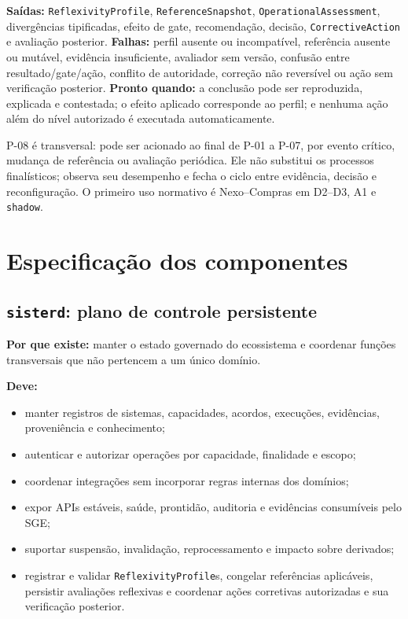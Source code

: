 \documentclass[11pt,a4paper,oneside]{article}
\begin{document}
\textbf{Saídas:} \texttt{ReflexivityProfile}, \texttt{ReferenceSnapshot}, \texttt{OperationalAssessment}, divergências tipificadas, efeito de gate, recomendação, decisão, \texttt{CorrectiveAction} e avaliação posterior.  
\textbf{Falhas:} perfil ausente ou incompatível, referência ausente ou mutável, evidência insuficiente, avaliador sem versão, confusão entre resultado/gate/ação, conflito de autoridade, correção não reversível ou ação sem verificação posterior.  
\textbf{Pronto quando:} a conclusão pode ser reproduzida, explicada e contestada; o efeito aplicado corresponde ao perfil; e nenhuma ação além do nível autorizado é executada automaticamente.

P-08 é transversal: pode ser acionado ao final de P-01 a P-07, por evento crítico, mudança de referência ou avaliação periódica. Ele não substitui os processos finalísticos; observa seu desempenho e fecha o ciclo entre evidência, decisão e reconfiguração. O primeiro uso normativo é Nexo--Compras em D2--D3, A1 e \texttt{shadow}.

\section{Especificação dos componentes}

\subsection{\texttt{sisterd}: plano de controle persistente}
\textbf{Por que existe:} manter o estado governado do ecossistema e coordenar funções transversais que não pertencem a um único domínio.

\textbf{Deve:}
\begin{itemize}
  \item manter registros de sistemas, capacidades, acordos, execuções, evidências, proveniência e conhecimento;
  \item autenticar e autorizar operações por capacidade, finalidade e escopo;
  \item coordenar integrações sem incorporar regras internas dos domínios;
  \item expor APIs estáveis, saúde, prontidão, auditoria e evidências consumíveis pelo SGE;
  \item suportar suspensão, invalidação, reprocessamento e impacto sobre derivados;
  \item registrar e validar \texttt{ReflexivityProfile}s, congelar referências aplicáveis, persistir avaliações reflexivas e coordenar ações corretivas autorizadas e sua verificação posterior.
\end{itemize}
\end{document}
